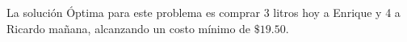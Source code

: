 
\begin{homeworkProblem}
La solución Óptima para este problema es comprar 3 litros hoy a Enrique y 4 a Ricardo mañana, alcanzando un costo mínimo de $\$19.50$.
\end{homeworkProblem}


